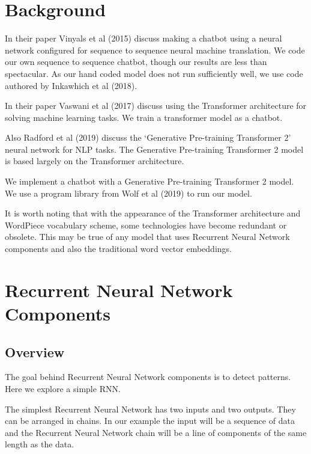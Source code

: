 

\section{Background}

In their paper Vinyals et al (2015)\cite{DBLP:journals/corr/VinyalsL15} discuss making a chatbot using a neural network configured for sequence to sequence neural machine translation. We code our own sequence to sequence chatbot, though our results are less than spectacular. As our hand coded model does not run sufficiently well, we use code authored by Inkawhich et al (2018)\cite{2018Inkawhich}.

In their paper Vaswani et al (2017)\cite{Vaswani2017AttentionIA} discuss using the Transformer architecture for solving machine learning tasks. We train a transformer model as a chatbot.

Also Radford et al (2019)\cite{radford2019language} discuss the `Generative Pre-training Transformer 2' neural network for \ac{NLP} tasks. The Generative Pre-training Transformer 2 model is based largely on the Transformer architecture. 

We implement a chatbot with a Generative Pre-training Transformer 2 model. We use a program library from Wolf et al (2019)\cite{Wolf2019HuggingFacesTS} to run our model.

It is worth noting that with the appearance of the Transformer architecture and WordPiece vocabulary scheme, some technologies have become redundant or obsolete. This may be true of any model that uses Recurrent Neural Network components and also the traditional word vector embeddings.

\section{Recurrent Neural Network Components}

\subsection*{Overview}
The goal behind Recurrent Neural Network components is to detect patterns. Here we explore a simple \ac{RNN}.

The simplest Recurrent Neural Network has two inputs and two outputs. They can be arranged in chains. In our example the input will be a sequence of data and the Recurrent Neural Network chain will be a line of components of the same length as the data.

